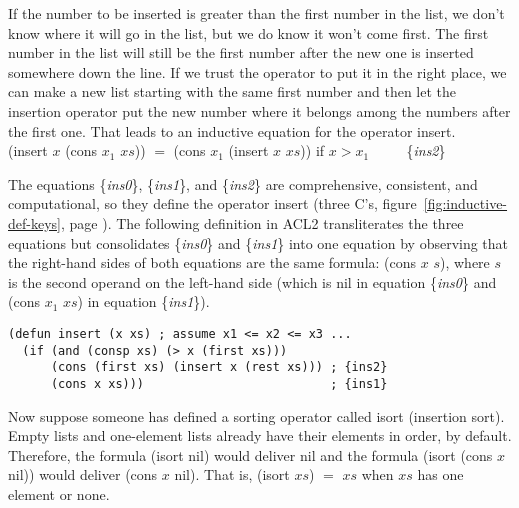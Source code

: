 If the number to be inserted is greater than the first number
in the list, we don't know where it will go in the list,
but we do know it won't come first.
The first number in the list will still be the first number
after the new one is inserted somewhere down the line.
If we trust the operator to put it in the right place,
we can make a new list starting with the same first number
and then  let the insertion operator put the new number
where it belongs among the numbers after the first one.
That leads to an inductive equation for the operator \textsf{insert}.
\vspace{2mm}\\
\hspace*{5mm}\textsf{(insert $x$ (cons $x_1$ $xs$)) $=$ (cons $x_1$ (insert $x$ $xs$))} if $x > x_1$ ~~~~ \{\emph{ins2}\}
\vspace{2mm}

The equations \{\emph{ins0}\}, \{\emph{ins1}\}, and \{\emph{ins2}\}
are comprehensive, consistent, and computational,
so they define the operator \textsf{insert}
(three C's, figure~\ref{fig:inductive-def-keys}, page \pageref{fig:inductive-def-keys}).
The following definition in ACL2 transliterates the three equations
but consolidates \{\emph{ins0}\} and \{\emph{ins1}\} into one equation
by observing that the right-hand sides of both equations
are the same formula: \textsf{(cons $x$ $s$)}, where $s$ is the second operand
on the left-hand side
(which is \textsf{nil} in equation \{\emph{ins0}\} and
\textsf{(cons $x_1$ $xs$)} in equation \{\emph{ins1}\}).

\label{defun:insert-isort}
\begin{code}
\begin{verbatim}
(defun insert (x xs) ; assume x1 <= x2 <= x3 ...
  (if (and (consp xs) (> x (first xs)))
      (cons (first xs) (insert x (rest xs))) ; {ins2}
      (cons x xs)))                          ; {ins1}
\end{verbatim}
\end{code}

Now suppose someone has defined a sorting operator called \textsf{isort}
(insertion sort).
Empty lists and one-element lists already have their
elements in order, by default.
Therefore, the formula \textsf{(isort nil}) would deliver \textsf{nil}
and the formula \textsf{(isort (cons $x$ nil))} would deliver
\textsf{(cons $x$ nil)}.
That is, \textsf{(isort $xs$) $=$ $xs$} when $xs$ has one element or none.

